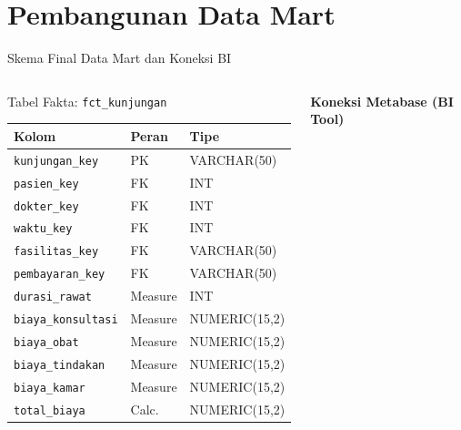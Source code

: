 \documentclass[xcolor=table,t,aspectratio=169]{beamer}
\begin{document}
\section{Pembangunan Data Mart}

\begin{frame}{Skema Final Data Mart dan Koneksi BI}
  \footnotesize
  \begin{columns}[T]
    \begin{block}{Tabel Fakta: \texttt{fct\_kunjungan}}
      \tiny
      \begin{tabular}{@{}lll@{}}
        \toprule
        \textbf{Kolom} & \textbf{Peran} & \textbf{Tipe} \\
        \midrule
        \texttt{kunjungan\_key}   & PK      & VARCHAR(50)   \\
        \texttt{pasien\_key}      & FK      & INT           \\
        \texttt{dokter\_key}      & FK      & INT           \\
        \texttt{waktu\_key}       & FK      & INT           \\
        \texttt{fasilitas\_key}   & FK      & VARCHAR(50)   \\
        \texttt{pembayaran\_key}  & FK      & VARCHAR(50)   \\
        \texttt{durasi\_rawat}    & Measure & INT           \\
        \texttt{biaya\_konsultasi}& Measure & NUMERIC(15,2) \\
        \texttt{biaya\_obat}      & Measure & NUMERIC(15,2) \\
        \texttt{biaya\_tindakan}  & Measure & NUMERIC(15,2) \\
        \texttt{biaya\_kamar}     & Measure & NUMERIC(15,2) \\
        \texttt{total\_biaya}     & Calc.   & NUMERIC(15,2) \\
        \bottomrule
      \end{tabular}
    \end{block}

    \textbf{Koneksi Metabase (BI Tool)}
    \vspace{4pt}


\end{columns}
\end{frame}
\end{document}
